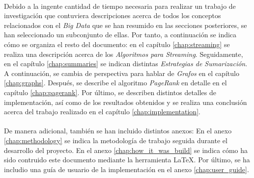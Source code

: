 \documentclass{subfiles}
\begin{document}
    \paragraph{}
    Debido a la ingente cantidad de tiempo necesaria para realizar un trabajo de investigación que contuviera descripciones acerca de todos los conceptos relacionados con el \emph{Big Data} que se han resumido en las secciones posteriores, se han seleccionado un subconjunto de ellas. Por tanto, a continuación se indica cómo se organiza el resto del documento: en el capítulo \ref{chap:streaming} se realiza una descripción acerca de los \emph{Algoritmos para Streaming}. Seguidamente, en el capítulo \ref{chap:summaries} se indican distintas \emph{Estrategias de Sumarización}. A continuación, se cambia de perspectiva para hablar de \emph{Grafos} en el capítulo \ref{chap:graphs}. Después, se describe el algoritmo \emph{PageRank} en detalle en el capítulo \ref{chap:pagerank}. Por último, se describen distintos detalles de implementación, así como de los resultados obtenidos y se realiza una conclusión acerca del trabajo realizado en el capítulo \ref{chap:implementation}.

    \paragraph{}
    De manera adicional, también se han incluido distintos anexos: En el anexo \ref{chap:methodology} se indica la metodología de trabajo seguida durante el desarrollo del proyecto. En el anexo \ref{chap:how_it_was_build} se indica cómo ha sido contruido este documento mediante la herramienta \LaTeX. Por último, se ha includio una guía de usuario de la implementación en el anexo \ref{chap:user_guide}.
\end{document}
